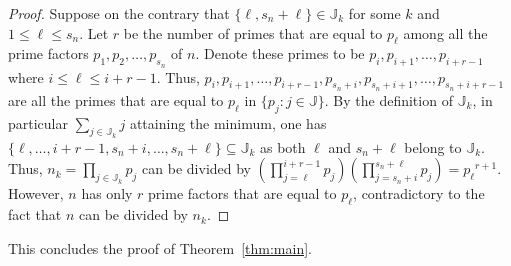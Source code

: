 \documentclass[11pt]{article}
\newtheorem{algorithm}[theorem]{Algorithm}
\newcommand{\R}{\mathbb{R}}
\newcommand{\BJ}{\mathbb{J}}
\begin{document}
\begin{proof}
Suppose on the contrary that $\{\ell,s_n+\ell\}\in\BJ_k$ for some $k$ and $1\le \ell\le s_n$.
Let $r$ be the number of primes that are equal to $p_\ell$ among all the prime factors $p_1,p_2,\dots,p_{s_n}$ of $n$. Denote these primes to be $p_i,p_{i+1},\dots,p_{i+r-1}$ where $i\le \ell\le i+r-1$. Thus, $p_i,p_{i+1},\dots,p_{i+r-1},p_{s_n+i},p_{s_n+i+1},\dots,p_{s_n+i+r-1}$ are all the primes that are equal to $p_\ell$ in $\{p_j:j\in\BJ\}$. By the definition of $\BJ_k$, in particular $\sum_{j\in\BJ_k} j$ attaining the minimum, one has $\{\ell,\dots,i+r-1,s_n+i,\dots,s_n+\ell\}\subseteq\BJ_k$ as both $\ell$ and $s_n+\ell$ belong to $\BJ_k$. Thus, $n_k=\prod_{j\in\BJ_k}p_j$ can be divided by $\left(\prod_{j=\ell}^{i+r-1}p_j\right) \left(\prod_{j=s_n+i}^{s_n+\ell}p_j\right)={p_\ell}^{r+1}$. However, $n$ has only $r$ prime factors that are equal to $p_\ell$, contradictory to the fact that $n$ can be divided by $n_k$.
\end{proof}

This concludes the proof of Theorem~\ref{thm:main}.



\end{document}

